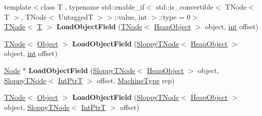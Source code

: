 \begin{DoxyCompactItemize}
{\footnotesize template$<$class T , typename std\+::enable\+\_\+if$<$ std\+::is\+\_\+convertible$<$ T\+Node$<$ T $>$, T\+Node$<$ Untagged\+T $>$$>$\+::value, int $>$\+::type  = 0$>$ }\\\mbox{\hyperlink{classv8_1_1internal_1_1compiler_1_1TNode}{T\+Node}}$<$ \mbox{\hyperlink{classv8_1_1internal_1_1torque_1_1T}{T}} $>$ {\bfseries Load\+Object\+Field} (\mbox{\hyperlink{classv8_1_1internal_1_1compiler_1_1TNode}{T\+Node}}$<$ \mbox{\hyperlink{classv8_1_1internal_1_1HeapObject}{Heap\+Object}} $>$ object, \mbox{\hyperlink{classint}{int}} offset)
\item 
\mbox{\label{classv8_1_1internal_1_1CodeStubAssembler_afd4714a90c522b6183d33d404b0966e2}} 
\mbox{\hyperlink{classv8_1_1internal_1_1compiler_1_1TNode}{T\+Node}}$<$ \mbox{\hyperlink{classv8_1_1internal_1_1Object}{Object}} $>$ {\bfseries Load\+Object\+Field} (\mbox{\hyperlink{classv8_1_1internal_1_1compiler_1_1SloppyTNode}{Sloppy\+T\+Node}}$<$ \mbox{\hyperlink{classv8_1_1internal_1_1HeapObject}{Heap\+Object}} $>$ object, \mbox{\hyperlink{classint}{int}} offset)
\item 
\mbox{\label{classv8_1_1internal_1_1CodeStubAssembler_a995eef501a22a12d840a22c745c47a73}} 
\mbox{\hyperlink{classv8_1_1internal_1_1compiler_1_1Node}{Node}} $\ast$ {\bfseries Load\+Object\+Field} (\mbox{\hyperlink{classv8_1_1internal_1_1compiler_1_1SloppyTNode}{Sloppy\+T\+Node}}$<$ \mbox{\hyperlink{classv8_1_1internal_1_1HeapObject}{Heap\+Object}} $>$ object, \mbox{\hyperlink{classv8_1_1internal_1_1compiler_1_1SloppyTNode}{Sloppy\+T\+Node}}$<$ \mbox{\hyperlink{structv8_1_1internal_1_1IntPtrT}{Int\+PtrT}} $>$ offset, \mbox{\hyperlink{classv8_1_1internal_1_1MachineType}{Machine\+Type}} rep)
\item 
\mbox{\label{classv8_1_1internal_1_1CodeStubAssembler_abdd5aa0848bce10c1af4569a3779c3a1}} 
\mbox{\hyperlink{classv8_1_1internal_1_1compiler_1_1TNode}{T\+Node}}$<$ \mbox{\hyperlink{classv8_1_1internal_1_1Object}{Object}} $>$ {\bfseries Load\+Object\+Field} (\mbox{\hyperlink{classv8_1_1internal_1_1compiler_1_1SloppyTNode}{Sloppy\+T\+Node}}$<$ \mbox{\hyperlink{classv8_1_1internal_1_1HeapObject}{Heap\+Object}} $>$ object, \mbox{\hyperlink{classv8_1_1internal_1_1compiler_1_1SloppyTNode}{Sloppy\+T\+Node}}$<$ \mbox{\hyperlink{structv8_1_1internal_1_1IntPtrT}{Int\+PtrT}} $>$ offset)

\end{DoxyCompactItemize}
